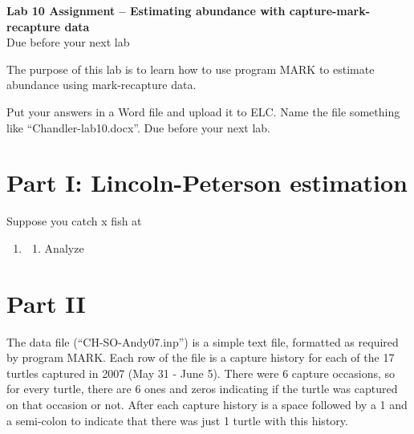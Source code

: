 \documentclass[12pt]{article}
\begin{document}
{
  \Large
  \centering
  {\bf Lab 10 Assignment -- Estimating abundance with
    capture-mark-recapture data} \\
  Due before your next lab \par
}

\vspace{10pt}


The purpose of this lab is to learn how to use program MARK to
estimate abundance using mark-recapture data. 

Put your answers in a Word file and upload it to ELC. Name the file
something like ``Chandler-lab10.docx''. Due before your next lab.  





\section*{\large Part I: Lincoln-Peterson estimation}

Suppose you catch x fish at 

\begin{enumerate}
  \item 
  \begin{enumerate}
    \item Analyze 
  \end{enumerate}
\end{enumerate}





\section*{\large  Part II}

The data file (``CH-SO-Andy07.inp'') is a simple text file, formatted
as required by program MARK. Each row of the file is a capture history
for each of the 17 turtles captured in 2007 (May 31 - June 5). There
were 6 capture occasions, so for every turtle, there are 6 ones and
zeros indicating if the turtle was captured on that occasion or
not. After each capture history is a space followed by a 1 and a
semi-colon to indicate that there was just 1 turtle with this history.  
\end{document}
